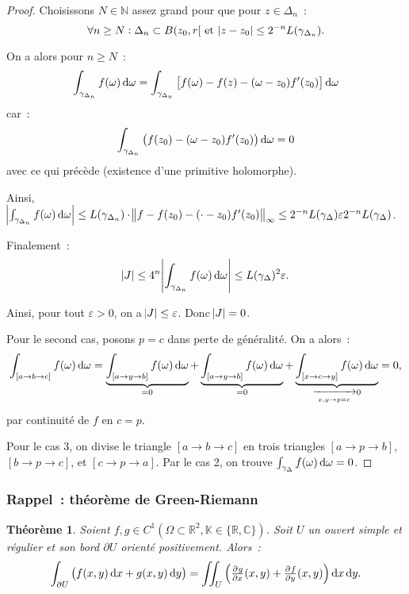 \documentclass{report}
\newtheorem{thm}{Théorème}[chapter]
\theoremstyle{definition}
\theoremstyle{remark}
\numberwithin{equation}{section}
\newcommand{\K}{\mathbb K}
\newcommand{\C}{\mathbb C}
\newcommand{\R}{\mathbb R}
\newcommand{\N}{\mathbb N}
\begin{document}
\begin{proof}
			Choisissons $N \in \N$ assez grand pour que pour $z \in \Delta_n$~:
			\begin{equation}
				\forall n \geq N : \Delta_n \subset B(z_0, r[ \text{ et } \abs {z-z_0} \leq 2^{-n}L(\gamma_{\Delta_n}).
			\end{equation}

			On a alors pour $n \geq N$~:
			\begin{equation}
				\int_{\gamma_{\Delta_n}}f(\omega)\dif \omega = \int_{\gamma_{\Delta_n}}\left[f(\omega) - f(z) - (\omega-z_0)f'(z_0)\right]\dif \omega
			\end{equation}
			car~:
			\begin{equation}
				\int_{\gamma_{\Delta_n}}\left(f(z_0) - (\omega-z_0)f'(z_0)\right)\dif \omega = 0
			\end{equation}
			avec ce qui précède (existence d'une primitive holomorphe).

			Ainsi, $\abs {\int_{\gamma_{\Delta_n}}f(\omega)\dif \omega} \leq L(\gamma_{\Delta_n})\cdot \norm {f-f(z_0) - (\cdot-z_0)f'(z_0)}_\infty
			\leq 2^{-n}L(\gamma_\Delta)\varepsilon2^{-n}L(\gamma_\Delta)$.

			Finalement~:
			\begin{equation}
				\abs J \leq 4^n\abs {\int_{\gamma_{\Delta_n}}f(\omega)\dif \omega} \leq L(\gamma_\Delta)^2\varepsilon.
			\end{equation}

			Ainsi, pour tout $\varepsilon > 0$, on a $\abs J \leq \varepsilon$. Donc $\abs J = 0$.

			Pour le second cas, posons $p = c$ dans perte de généralité. On a alors~:
			\begin{equation}
				\int_{[a \to b \to c]}f(\omega)\dif \omega = \underbrace {\int_{[a \to y \to b]}f(\omega)\dif \omega}_{= 0}
					+ \underbrace {\int_{[a \to y \to b]} f(\omega)\dif \omega}_{= 0}
					+ \underbrace {\int_{[x \to c \to y]}f(\omega)\dif \omega}_{\xrightarrow[x, y \to p=c]{} 0} = 0,
			\end{equation}
			par continuité de $f$ en $c=p$.

			Pour le cas 3, on divise le triangle $[a \to b \to c]$ en trois triangles $[a \to p \to b]$, $[b \to p \to c]$, et $[c \to p \to a]$.
			Par le cas 2, on trouve $\int_{\gamma_\Delta} f(\omega)\dif \omega = 0$.
			\end{proof}

			\subsubsection{Rappel~: théorème de Green-Riemann}
				\begin{thm} Soient $f, g \in C^1\left(\Omega \subset \R^2, \K \in \{\R, \C\}\right)$. Soit $U$ un ouvert \textit{simple} et \textit{régulier} et son bord
				$\partial U$ orienté positivement. Alors~:
				\begin{equation}
					\int_{\partial U}\left(f(x, y)\dif x + g(x, y)\dif y\right) = \iint_U\left(\pd gx(x, y) + \pd fy(x, y)\right)\dif x\dif y.
				\end{equation}
				\end{thm}
\end{document}
